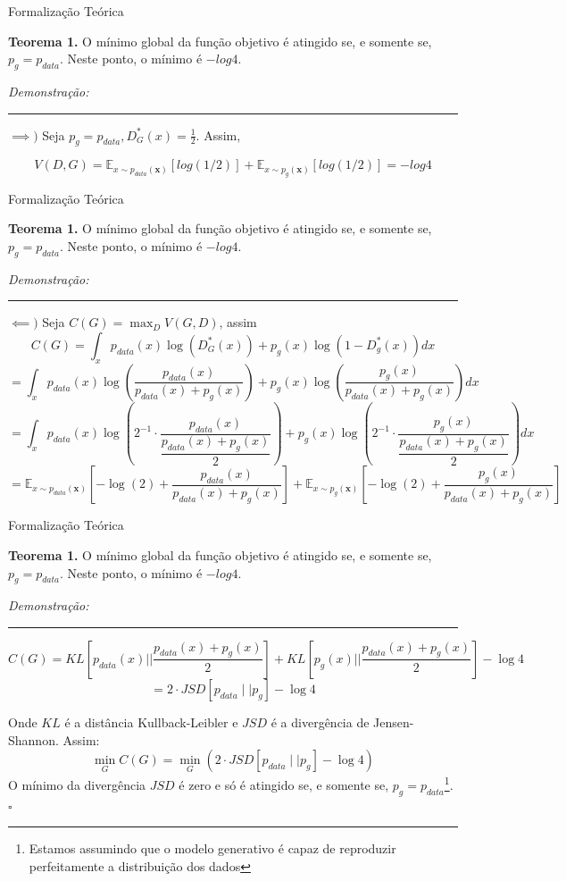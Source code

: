 \documentclass[10pt]{beamer}
\newcommand*{\QEDB}{\hfill\ensuremath{\square}}%
\begin{document}
\begin{frame}[fragile]{Formalização Teórica}

	\textbf{Teorema 1.} O mínimo global da função objetivo
	é atingido se, e somente se, $p_g = p_{data}$. Neste ponto,
	o mínimo é $-log4$.

	\textit{Demonstração:}
	\hrule

	$
	\implies )$
	Seja $p_g = p_{data}, D^*_G(x) = \frac{1}{2}$. Assim,

  $$V(D,G)=
    \mathbb{E}_{x\sim p_{data}(\bm x)}\left[log (1/2) \right]+
    \mathbb{E}_{x\sim p_g(\bm x)}\left[log(1/2)\right] =  -log4
  $$


\end{frame}

\begin{frame}[fragile]{Formalização Teórica}

\small
	\textbf{Teorema 1.} O mínimo global da função objetivo
	é atingido se, e somente se, $p_g = p_{data}$. Neste ponto,
	o mínimo é $-log4$.

	\textit{Demonstração:}
	\hrule

	$
	\impliedby )$ Seja $C(G) = \max_{D}V(G,D)$, assim
  $$C(G) = \int_{x}p_{data}(x)\log{\left(D_{G}^{*}(x)\right)}
  + p_{g}(x)\log{\left(1-D_{g}^{*}(x)\right)}dx $$
  \pause
  $$
  = \int_{x}p_{data}(x)\log{\left(\dfrac{p_{data}(x)}{p_{data}(x)
  + p_{g}(x)}\right)} + p_{g}(x)\log{\left(\dfrac{p_{g}(x)}{p_{data}(x)
  + p_{g}(x)}\right)}dx $$
  \pause
  $$= \int_{x}p_{data}(x)
  \log{\left(2^{-1}\cdot \dfrac{p_{data}(x)}{\dfrac{p_{data}(x)
  + p_{g}(x)}{2}}\right)} + p_{g}(x)
  \log{\left(2^{-1}\cdot \dfrac{p_{g}(x)}{\dfrac{p_{data}(x)
  + p_{g}(x)}{2}}\right)}dx	$$
  \pause
  $$=
    \mathbb{E}_{x\sim p_{data}(\bm x)}\left[-\log (2)+
    \frac{p_{data}(x)}{p_{data}(x)+p_g(x)}\right]+
    \mathbb{E}_{x\sim p_g(\bm x)}\left[-\log(2)+
    \frac{p_{g}(x)}{p_{data}(x)+p_g(x)}\right]
  $$

\end{frame}

\begin{frame}[fragile]{Formalização Teórica}

\small
	\textbf{Teorema 1.} O mínimo global da função objetivo
	é atingido se, e somente se, $p_g = p_{data}$. Neste ponto,
	o mínimo é $-log4$.

	\textit{Demonstração:}
	\hrule
  $$C(G) = KL\left[p_{data}(x)||\dfrac{p_{data}(x)+p_g(x)}{2}\right] + KL\left[p_g(x)||\dfrac{p_{data}(x) + p_g(x)}{2}\right] - \log{4} $$
  $$= 2 \cdot JSD\left[ p_{data} \mid \mid p_g
  \right] - \log 4$$

  Onde $KL$ é a distância Kullback-Leibler e $JSD$ é a divergência
  de Jensen-Shannon. Assim:
  $$\min_G C(G) = \min_G \left( 2 \cdot JSD\left[ p_{data} \mid \mid p_g
  \right] - \log 4 \right)$$
  O mínimo da divergência $JSD$ é zero e só é atingido se, e somente se,
  $p_g = p_{data}$\footnote{Estamos assumindo que o modelo
  generativo é capaz de reproduzir perfeitamente a distribuição dos
  dados}. \QEDB
\end{frame}
\end{document}
